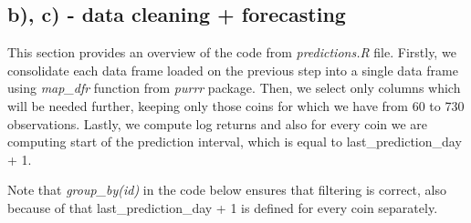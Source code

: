 \documentclass[
]{article}
\newenvironment{Shaded}{\begin{snugshade}}{\end{snugshade}}
\newcommand{\AttributeTok}[1]{\textcolor[rgb]{0.13,0.29,0.53}{#1}}
\newcommand{\DecValTok}[1]{\textcolor[rgb]{0.00,0.00,0.81}{#1}}
\newcommand{\FunctionTok}[1]{\textcolor[rgb]{0.13,0.29,0.53}{\textbf{#1}}}
\newcommand{\NormalTok}[1]{#1}
\newcommand{\OtherTok}[1]{\textcolor[rgb]{0.56,0.35,0.01}{#1}}
\newcommand{\SpecialCharTok}[1]{\textcolor[rgb]{0.81,0.36,0.00}{\textbf{#1}}}
\newcommand{\StringTok}[1]{\textcolor[rgb]{0.31,0.60,0.02}{#1}}
\begin{document}
\begin{Shaded}
\end{Shaded}

\newpage

\subsection{b), c) - data cleaning +
forecasting}\label{b-c---data-cleaning-forecasting}

This section provides an overview of the code from \emph{predictions.R}
file. Firstly, we consolidate each data frame loaded on the previous
step into a single data frame using \emph{map\_dfr} function from
\emph{purrr} package. Then, we select only columns which will be needed
further, keeping only those coins for which we have from 60 to 730
observations. Lastly, we compute log returns and also for every coin we
are computing start of the prediction interval, which is equal to
last\_prediction\_day + 1.

Note that \emph{group\_by(id)} in the code below ensures that filtering
is correct, also because of that last\_prediction\_day + 1 is defined
for every coin separately.
\end{document}
